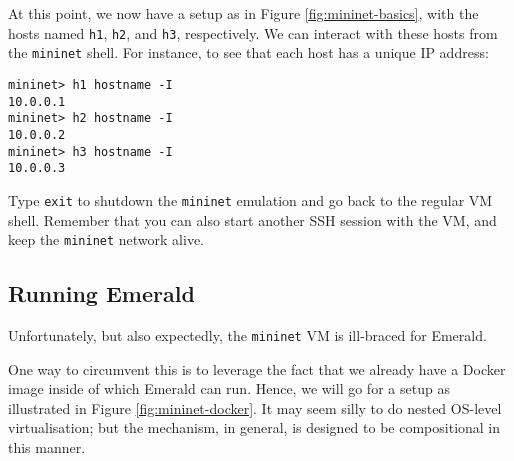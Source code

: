\documentclass{article}
\newcommand{\mininet}{\texttt{mininet}}
\begin{document}
At this point, we now have a setup as in Figure
\ref{fig:mininet-basics}, with the hosts named \texttt{h1},
\texttt{h2}, and \texttt{h3}, respectively. We can interact with these
hosts from the \mininet{} shell. For instance, to see that each host
has a unique IP address:

\begin{lstlisting}
mininet> h1 hostname -I
10.0.0.1
mininet> h2 hostname -I
10.0.0.2
mininet> h3 hostname -I
10.0.0.3
\end{lstlisting}

Type \texttt{exit} to shutdown the \mininet{} emulation and go back to
the regular VM shell. Remember that you can also start another SSH
session with the VM, and keep the \mininet{} network alive. 

\subsection{Running Emerald}

Unfortunately, but also expectedly, the \mininet{} VM is ill-braced for Emerald.

One way to circumvent this is to leverage the fact that we already
have a Docker image inside of which Emerald can run. Hence, we will go
for a setup as illustrated in Figure \ref{fig:mininet-docker}. It may
seem silly to do nested OS-level virtualisation; but the mechanism, in
general, is designed to be compositional in this manner.
\end{document}
